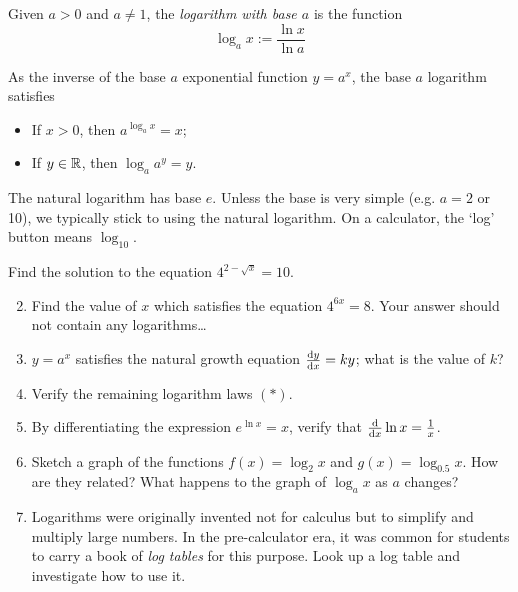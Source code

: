 \begin{defn}{}{}
Given $a>0$ and $a\neq 1$, the \emph{logarithm with base $a$} is the function
\[\log_ax :=\frac{\ln x}{\ln a}\]
\end{defn}

As the inverse of the base $a$ exponential function $y=a^x$, the base $a$ logarithm satisfies
\begin{itemize}
	\item If $x>0$, then $a^{\log_a x}=x$;
	\item If $y\in\R$, then $\log_a a^y=y$.
\end{itemize}
The natural logarithm has base $e$. Unless the base is very simple (e.g.{} $a=2$ or 10), we typically stick to using the natural logarithm. On a calculator, the `log' button means $\log_{10}$.





\begin{exercises}{}{}
\exstart Find the solution to the equation $4^{2-\sqrt x}=10$.
\begin{enumerate}\setcounter{enumi}{1}
  \item Find the value of $x$ which satisfies the equation $4^{6x}=8$. Your answer should not contain any logarithms\ldots

  \item $y=a^x$ satisfies the natural growth equation $\diff[y]x=ky$; what is the value of $k$?
  
	\item Verify the remaining logarithm laws $(\ast)$.
  \item By differentiating the expression $e^{\ln x}=x$, verify that $\diff x\ln x=\frac 1x$.
  
  \item Sketch a graph of the functions $f(x)=\log_2x$ and $g(x)=\log_{0.5}x$. How are they related? What happens to the graph of $\log_ax$ as $a$ changes?

  \item Logarithms were originally invented not for calculus but to simplify and multiply large numbers. In the pre-calculator era, it was common for students to carry a book of \emph{log tables} for this purpose. Look up a log table and investigate how to use it.
\end{enumerate}
\end{exercises}


